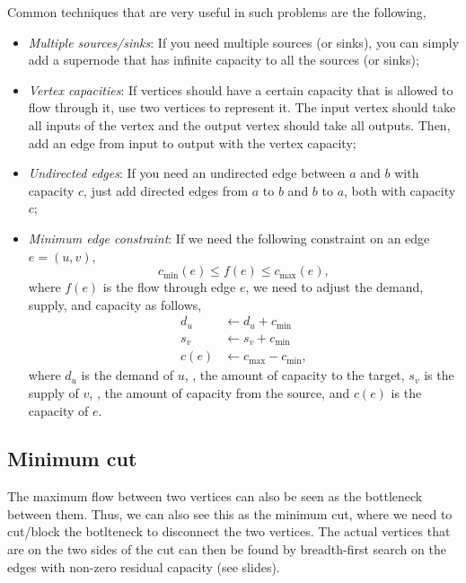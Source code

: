 \documentclass[justified,nobib]{tufte-handout}
\begin{document}
Common techniques that are very useful in such problems are the following,
\begin{itemize}
  \item \textit{Multiple sources/sinks}: If you need multiple sources (or
    sinks), you can simply add a supernode that has infinite capacity to all
    the sources (or sinks);
  \item \textit{Vertex capacities}: If vertices should have a certain capacity
    that is allowed to flow through it, use two vertices to represent it. The
    input vertex should take all inputs of the vertex and the output vertex
    should take all outputs. Then, add an edge from input to output with the
    vertex capacity;
  \item \textit{Undirected edges}: If you need an undirected edge between $a$
    and $b$ with capacity $c$, just add directed edges from $a$ to $b$ and $b$
    to $a$, both with capacity $c$;
  \item \textit{Minimum edge constraint}: If we need the following constraint
    on an edge $e=(u,v)$, \[
      c_{\min}(e) \leq f(e) \leq c_{\max}(e)
    ,\]
    where $f(e)$ is the flow through edge $e$, we need to adjust the demand,
    supply, and capacity as follows,
    \begin{align*}
      d_u &\gets d_u + c_{\min} \\
      s_v &\gets s_v + c_{\min} \\
      c(e) &\gets c_{\max} - c_{\min}
    ,\end{align*}
    where $d_u$ is the demand of $u$, \ie, the amount of capacity to the
    target, $s_v$ is the supply of $v$, \ie, the amount of capacity from the
    source, and $c(e)$ is the capacity of $e$. 
\end{itemize}

\subsection{Minimum cut}

The maximum flow between two vertices can also be seen as the bottleneck
between them. Thus, we can also see this as the minimum cut, where we need to
cut/block the botlteneck to disconnect the two vertices. The actual vertices
that are on the two sides of the cut can then be found by breadth-first search
on the edges with non-zero residual capacity (see slides).
\end{document}
